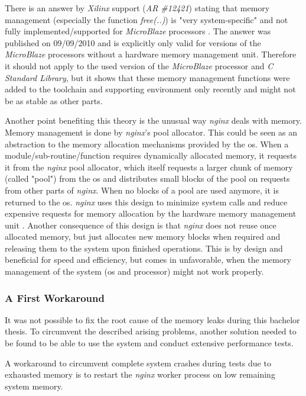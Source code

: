 There is an answer by \textit{Xilinx} support (\textit{AR \#12421}) stating that memory management (especially the function \textit{free(..)}) is "very system-specific" and not fully implemented/supported for \textit{MicroBlaze} processors \cite{mbfree}. The answer was published on 09/09/2010 and is explicitly only valid for versions of the \textit{MicroBlaze} processors without a hardware memory management unit. Therefore it should not apply to the used version of the \textit{MicroBlaze} processor and \textit{C Standard Library}, but it shows that these memory management functions were added to the toolchain and supporting environment only recently and might not be as stable as other parts.

Another point benefiting this theory is the unusual way \textit{nginx} deals with memory. Memory management is done by \textit{nginx}'s pool allocator. This could be seen as an abstraction to the memory allocation mechanisms provided by the \gls{os}. When a module/sub-routine/function requires dynamically allocated memory, it requests it from the \textit{nginx} pool allocator, which itself requests a larger chunk of memory (called "pool") from the \gls{os} and distributes small blocks of the pool on requests from other parts of \textit{nginx}. When no blocks of a pool are used anymore, it is returned to the \gls{os}. \textit{nginx} uses this design to minimize system calls and reduce expensive requests for memory allocation by the hardware memory management unit \cite{aosa}. Another consequence of this design is that \textit{nginx} does not reuse once allocated memory, but just allocates new memory blocks when required and releasing them to the system upon finished operations. This is by design and beneficial for speed and efficiency, but comes in unfavorable, when the memory management of the system (\gls{os} and processor) might not work properly.

\subsubsection{A First Workaround}

It was not possible to fix the root cause of the memory leaks during this bachelor thesis. To circumvent the described arising problems, another solution needed to be found to be able to use the system and conduct extensive performance tests.

A workaround to circumvent complete system crashes during tests due to exhausted memory is to restart the \textit{nginx} worker process on low remaining system memory.

